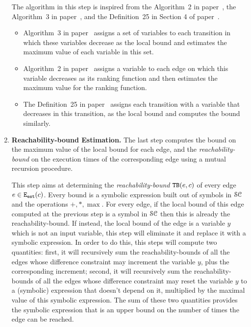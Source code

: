 \begin{enumerate}
 The algorithm in this step is inspired from the Algorithm~2 in paper~\cite{SinnZV14},
 the Algorithm~3 in paper~\cite{ZulegerGSV11},
 and the Definition~25 in Section 4 of paper~\cite{SinnZV17}.
 \begin{itemize}
 \item Algorithm~3 in paper~\cite{ZulegerGSV11} assigns a set of variables to each transition in which these variables decrease as the local bound
 and estimates the maximum value of each variable in this set.
 \item Algorithm~2 in paper~\cite{SinnZV14} assigns a variable to each edge on which this variable decreases as its ranking function
 and then estimates the maximum value for the ranking function.
 \item The Definition~25 in paper~\cite{SinnZV17}
 assigns each transition with a variable that decreases in this transition, as the local bound and computes the bound similarly.
 \end{itemize}


 \item \textbf{Reachability-bound Estimation.}
 The last step computes the bound on the maximum value of the local bound for each edge,
 and the \emph{reachability-bound} on the execution
 times of the corresponding edge using a mutual recursion procedure.

This step aims at determining the \emph{reachability-bound} ${\mathtt{TB}}(e, c)$ of every edge $e\in \mathtt{{E_{est}}}(c)$.
Every bound is a symbolic expression built out of symbols in $\mathcal{SC}$ and the operations $+, *, \max$.
For every edge, if the local bound of this edge computed at the previous step is a symbol in $\mathcal{SC}$ then this is already the reachability-bound. 
If instead, the local bound of the edge is a variable $y$ which is not an input variable, this step will eliminate it and replace it with a symbolic expression.
In order to do this, this steps will compute two quantities: first, it will recursively sum the reachability-bounds of all the edges whose difference constraint may increment the variable $y$, plus the corresponding increment;
second, it will recursively sum the reachability-bounds of all the edges whose difference constraint may reset the variable $y$ to a (symbolic) expression that doesn't depend on it, multiplied by the maximal value of this symbolic expression. The sum of these two quantities provides the symbolic expression that is an upper bound on the number of times the edge can be reached.


\end{enumerate}
